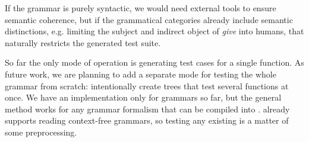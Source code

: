  If the grammar is purely
syntactic, we would need external tools to ensure semantic coherence,
but if the grammatical categories already include semantic
distinctions, e.g. limiting the subject and indirect object of
\emph{give} into humans, that naturally restricts the generated test
suite.


So far the only mode of operation is generating test cases for a
single function.
As future work, we are planning to add a separate
mode for testing the whole grammar from scratch: intentionally create
trees that test several functions at once.
We have an implementation only for \gf{} grammars so far, but the
general method works for any grammar formalism that can be compiled
into \pmcfg{}. \gf{} already supports reading context-free grammars,
so testing any existing \cfg{} is a matter of some preprocessing.
